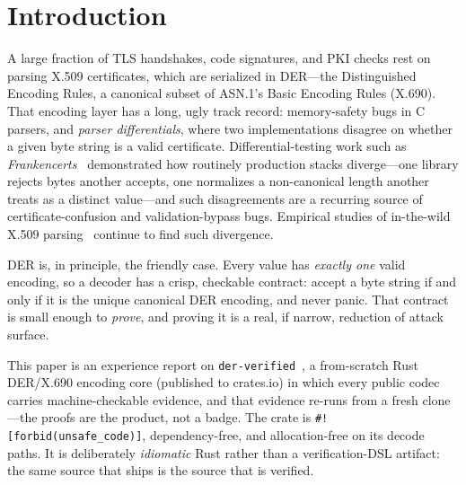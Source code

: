 \documentclass[10pt,twocolumn]{article}
\newcommand{\code}[1]{\texttt{\small #1}}
\newcommand{\crate}{\code{der-verified}}
\begin{document}
\section{Introduction}

A large fraction of TLS handshakes, code signatures, and PKI checks rest on
parsing X.509 certificates, which are serialized in DER---the Distinguished
Encoding Rules, a canonical subset of ASN.1's Basic Encoding Rules (X.690).
That encoding layer has a long, ugly track record: memory-safety bugs in C
parsers, and \emph{parser differentials}, where two implementations disagree on
whether a given byte string is a valid certificate. Differential-testing work
such as \emph{Frankencerts}~\cite{frankencerts} demonstrated how routinely
production stacks diverge---one library rejects bytes another accepts, one
normalizes a non-canonical length another treats as a distinct value---and such
disagreements are a recurring source of certificate-confusion and
validation-bypass bugs. Empirical studies of in-the-wild X.509
parsing~\cite{parseval} continue to find such divergence.

DER is, in principle, the friendly case. Every value has \emph{exactly one}
valid encoding, so a decoder has a crisp, checkable contract: accept a byte
string if and only if it is the unique canonical DER encoding, and never
panic. That contract is small enough to \emph{prove}, and proving it is a
real, if narrow, reduction of attack surface.

This paper is an experience report on \crate{}~\cite{repo}, a from-scratch
Rust DER/X.690 encoding core (published to crates.io) in which every public
codec carries machine-checkable evidence, and that evidence re-runs from a
fresh clone---the proofs are the product, not a badge. The crate is
\code{\#![forbid(unsafe\_code)]}, dependency-free, and allocation-free on its
decode paths. It is deliberately \emph{idiomatic} Rust rather than a
verification-DSL artifact: the same source that ships is the source that is
verified.
\end{document}
